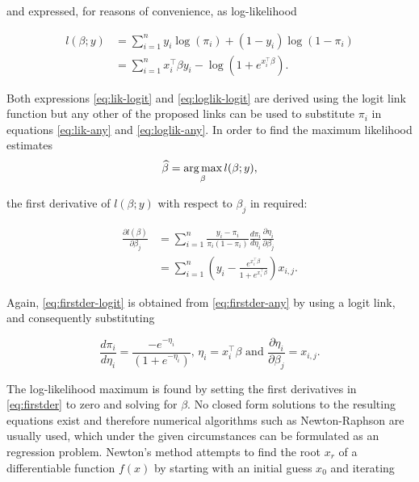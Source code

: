 and expressed, for reasons of convenience, as log-likelihood

\begin{subequations}
\begin{align}
  l(\beta; y) &= \sum_{i=1}^n y_i \log(\pi_i) + (1-y_i) \log(1-\pi_i) \label{eq:loglik-any} \\
  &= \sum_{i=1}^n x_i^\intercal \beta y_i -  \log\left(1+e^{x_i^\intercal \beta}\right). \label{eq:loglik-logit}
\end{align}
\end{subequations}

Both expressions \ref{eq:lik-logit} and \ref{eq:loglik-logit} are derived using the logit link function but any other of the proposed links can be used to substitute $\pi_i$ in equations \ref{eq:lik-any} and \ref{eq:loglik-any}. In order to find the maximum likelihood estimates
\begin{equation}
\widehat{\beta} = \operatorname*{arg\, max}_{\beta} l(\beta; y), 
\end{equation}

the first derivative of $l(\beta; y)$ with respect to $\beta_j$ in required:

\begin{subequations}\label{eq:firstder}
\begin{align}
  \frac{\partial l(\beta)}{\partial \beta_j} &= \sum_{i=1}^n \frac{y_i - \pi_i}{\pi_i (1-\pi_i)} \frac{d \pi_i}{d \eta_i} \frac{\partial \eta_i}{\partial \beta_j} \label{eq:firstder-any} \\
  &= \sum_{i=1}^n \left(y_i - \frac{e^{x_i^\intercal \beta}}{1+e^{x_i^\intercal \beta}}\right) x_{i,j} . \label{eq:firstder-logit}
\end{align}
\end{subequations}

Again, \ref{eq:firstder-logit} is obtained from \ref{eq:firstder-any} by using a logit link, and consequently substituting 

\begin{equation*}
  \frac{d \pi_i}{d \eta_i} = \frac{-e^{-\eta_i}}{(1+e^{-\eta_i})} \text{,\ \ } \eta_i = x_i^\intercal \beta \text{\ \ and\ \ } \frac{\partial \eta_i}{\partial \beta_j} = x_{i,j}.
\end{equation*}

The log-likelihood maximum is found by setting the first derivatives in \ref{eq:firstder} to zero and solving for $\beta$. No closed form solutions to the resulting equations exist and therefore numerical algorithms such as Newton-Raphson are usually used, which under the given circumstances can be formulated as an  regression problem. Newton's method attempts to find the root $x_r$ of a differentiable function $f(x)$ by starting with an initial guess $x_0$ and iterating

